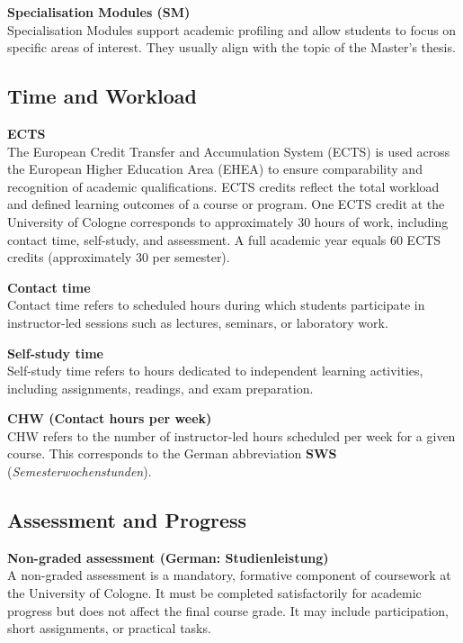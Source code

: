 \documentclass[
  letterpaper,
  10pt,
  openany]{book}
\begin{document}
\textbf{Specialisation Modules (SM)}\\
Specialisation Modules support academic profiling and allow students to
focus on specific areas of interest. They usually align with the topic
of the Master's thesis.

\subsection*{Time and Workload}\label{time-and-workload}

\textbf{ECTS}\\
The European Credit Transfer and Accumulation System (ECTS) is used
across the European Higher Education Area (EHEA) to ensure comparability
and recognition of academic qualifications. ECTS credits reflect the
total workload and defined learning outcomes of a course or program. One
ECTS credit at the University of Cologne corresponds to approximately 30
hours of work, including contact time, self-study, and assessment. A
full academic year equals 60 ECTS credits (approximately 30 per
semester).

\textbf{Contact time}\\
Contact time refers to scheduled hours during which students participate
in instructor-led sessions such as lectures, seminars, or laboratory
work.

\textbf{Self-study time}\\
Self-study time refers to hours dedicated to independent learning
activities, including assignments, readings, and exam preparation.

\textbf{CHW (Contact hours per week)}\\
CHW refers to the number of instructor-led hours scheduled per week for
a given course. This corresponds to the German abbreviation \textbf{SWS}
(\emph{Semesterwochenstunden}).

\subsection*{Assessment and Progress}\label{assessment-and-progress}

\textbf{Non-graded assessment (German: Studienleistung)}\\
A non-graded assessment is a mandatory, formative component of
coursework at the University of Cologne. It must be completed
satisfactorily for academic progress but does not affect the final
course grade. It may include participation, short assignments, or
practical tasks.
\end{document}
